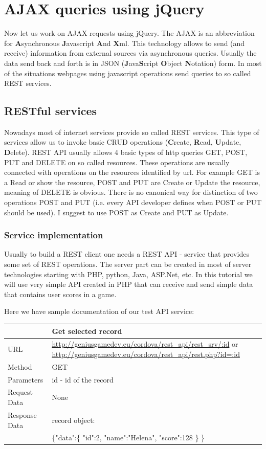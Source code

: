 \chapter{AJAX queries using jQuery }

Now let us work on AJAX requests using jQuery. The AJAX is an abbreviation for \textbf{A}synchronous \textbf{J}avascript \textbf{A}nd \textbf{X}ml. This technology allows to send (and receive) information from external sources via asynchronous queries. Usually the data send back and forth is in JSON (\textbf{J}ava\textbf{S}cript \textbf{O}bject \textbf{N}otation) form. In most of the situations webpages using javascript operations send queries to so called REST services.

\section{RESTful services}
Nowadays most of internet services provide so called REST services. This type of services allow us to invoke basic CRUD operations (\textbf{C}reate, \textbf{R}ead, \textbf{U}pdate, \textbf{D}elete). REST API usually allows 4 basic types of http queries GET, POST, PUT and DELETE on so called resources. These operations are usually connected with operations on the resources identified by url. For example GET is a Read or show the resource, POST and PUT are Create or Update the resource, meaning of DELETE is obvious. There is no canonical way for distinction of two operations POST and PUT (i.e. every API developer defines when POST or PUT should be used). I suggest to use POST as Create and PUT as Update.

\subsection{Service implementation}
Usually to build a REST client one needs a REST API - service that provides some set of REST operations. The server part can be created in most of server technologies starting with PHP, python, Java, ASP.Net, etc. In this tutorial we will use very simple API created in PHP that can receive and send simple data that contains user scores in a game.

Here we have sample documentation of our test API service:

\begin{tabularx}{\textwidth}{|l|X|}
\hline
&\textbf{Get selected record}\\\hline
URL &   \url{http://geniusgamedev.eu/cordova/rest_api/rest_srv/:id} or \url{http://geniusgamedev.eu/cordova/rest_api/rest.php?id=:id}\\\hline
Method  & GET\\\hline
Parameters  & id - id of the record \\\hline
Request Data & None\\\hline
Response Data & record object:\\
&
\{"data":\{
    "id":2,
    "name":"Helena",
    "score":128
    \}
\}
\\\hline
\end{tabularx}

